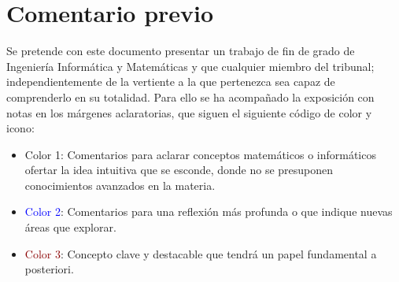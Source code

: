 
\section*{Comentario previo}

Se pretende con este documento presentar un  trabajo de fin de grado de Ingeniería Informática y Matemáticas y que cualquier miembro del tribunal; 
independientemente de la vertiente a la que pertenezca sea capaz de comprenderlo en su totalidad.  
Para ello se ha acompañado la exposición con notas en los márgenes aclaratorias, que siguen el siguiente código de color y icono: 

\begin{itemize}
    \item  \iconoAclaraciones \textcolor{dark_green}{ Color 1}: Comentarios para 
    aclarar conceptos matemáticos o informáticos ofertar la idea intuitiva que 
    se esconde, donde no se presuponen conocimientos avanzados en 
    la materia. 
    \item  \iconoProfundizar \textcolor{blue}{  Color 2}: Comentarios para una reflexión más profunda o que indique nuevas áreas que explorar. 
    \item  \iconoClave  \textcolor{darkRed}{  Color 3}: Concepto clave y destacable que tendrá un papel fundamental a posteriori.  
\end{itemize}

